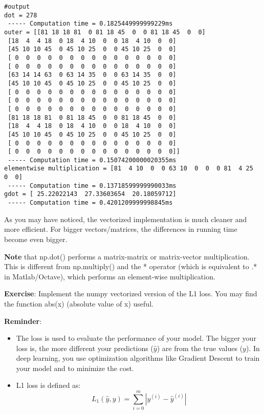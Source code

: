 \begin{verbatim}
#output
dot = 278
 ----- Computation time = 0.1825449999999229ms
outer = [[81 18 18 81  0 81 18 45  0  0 81 18 45  0  0]
 [18  4  4 18  0 18  4 10  0  0 18  4 10  0  0]
 [45 10 10 45  0 45 10 25  0  0 45 10 25  0  0]
 [ 0  0  0  0  0  0  0  0  0  0  0  0  0  0  0]
 [ 0  0  0  0  0  0  0  0  0  0  0  0  0  0  0]
 [63 14 14 63  0 63 14 35  0  0 63 14 35  0  0]
 [45 10 10 45  0 45 10 25  0  0 45 10 25  0  0]
 [ 0  0  0  0  0  0  0  0  0  0  0  0  0  0  0]
 [ 0  0  0  0  0  0  0  0  0  0  0  0  0  0  0]
 [ 0  0  0  0  0  0  0  0  0  0  0  0  0  0  0]
 [81 18 18 81  0 81 18 45  0  0 81 18 45  0  0]
 [18  4  4 18  0 18  4 10  0  0 18  4 10  0  0]
 [45 10 10 45  0 45 10 25  0  0 45 10 25  0  0]
 [ 0  0  0  0  0  0  0  0  0  0  0  0  0  0  0]
 [ 0  0  0  0  0  0  0  0  0  0  0  0  0  0  0]]
 ----- Computation time = 0.15074200000020355ms
elementwise multiplication = [81  4 10  0  0 63 10  0  0  0 81  4 25  0  0]
 ----- Computation time = 0.13718599999990033ms
gdot = [ 25.22022143  27.33603654  20.18059712]
 ----- Computation time = 0.4201209999998845ms
\end{verbatim}

As you may have noticed, the vectorized implementation is much cleaner and more efficient. For bigger vectors/matrices, the differences in running time become even bigger.

{\textbf {Note}} that np.dot() performs a matrix-matrix or matrix-vector multiplication. This is different from np.multiply() and the * operator (which is equivalent to  .* in Matlab/Octave), which performs an element-wise multiplication.




{\textbf {Exercise}}: Implement the numpy vectorized version of the L1 loss. You may find the function abs(x) (absolute value of x) useful.

{\textbf {Reminder}}:
\begin{itemize}
\item The loss is used to evaluate the performance of your model. The bigger your loss is, the more different your predictions ($ \hat{y} $) are from the true values ($y$). In deep learning, you use optimization algorithms like Gradient Descent to train your model and to minimize the cost.
\item L1 loss is defined as:
\begin{equation}
 L_1(\hat{y}, y) = \sum_{i=0}^m|y^{(i)} - \hat{y}^{(i)}| 
\end{equation}
\end{itemize}
 
